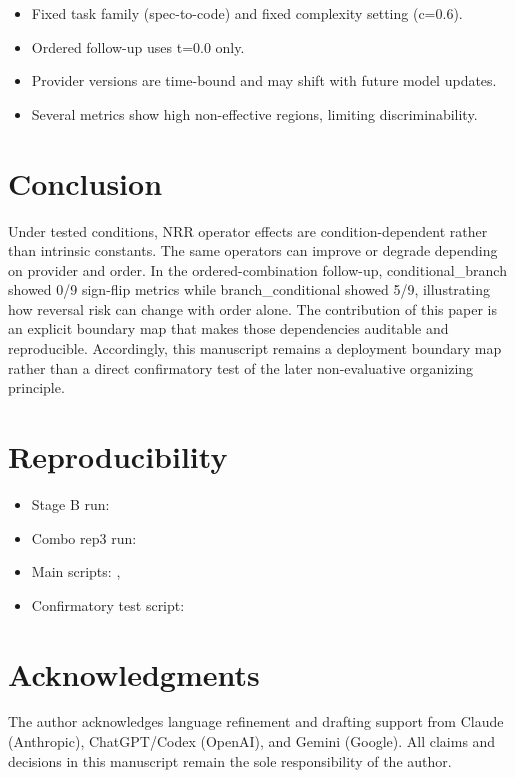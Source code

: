 \documentclass[11pt,a4paper]{article}
\begin{document}
\begin{itemize}
  \item Fixed task family (spec-to-code) and fixed complexity setting (c=0.6).
  \item Ordered follow-up uses t=0.0 only.
  \item Provider versions are time-bound and may shift with future model updates.
  \item Several metrics show high non-effective regions, limiting discriminability.
\end{itemize}

\section{Conclusion}
\label{sec:conclusion}

Under tested conditions, NRR operator effects are condition-dependent rather than intrinsic constants. The same operators can improve or degrade depending on provider and order. In the ordered-combination follow-up, conditional\_branch showed 0/9 sign-flip metrics while branch\_conditional showed 5/9, illustrating how reversal risk can change with order alone. The contribution of this paper is an explicit boundary map that makes those dependencies auditable and reproducible.
Accordingly, this manuscript remains a deployment boundary map rather than a direct
confirmatory test of the later non-evaluative organizing principle.

\section{Reproducibility}
\label{sec:repro}

\begin{itemize}
  \item Stage B run: 
  \item Combo rep3 run: 
  \item Main scripts:
    ,
  \item Confirmatory test script:
\end{itemize}

\section*{Acknowledgments}
The author acknowledges language refinement and drafting support from Claude
(Anthropic), ChatGPT/Codex (OpenAI), and Gemini (Google). All claims and
decisions in this manuscript remain the sole responsibility of the author.
\end{document}
